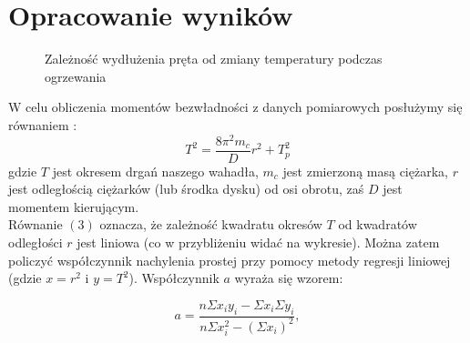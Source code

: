 \documentclass[10pt,a4paper]{article}
\newcommand{\forceindent}{\leavevmode{\parindent=3em\indent}}
\begin{document}
\section{Opracowanie wyników}

\begin{figure}[!h]
\centering
{}
\caption{Zależność wydłużenia pręta od zmiany temperatury podczas ogrzewania}
\label{fig:wyk}
\end{figure}

\forceindent W celu obliczenia momentów bezwładności z danych pomiarowych posłużymy się równaniem :
\begin{equation}
T^2 = \frac{8 \pi^2 m_c}{D}r^2 + T_p^2
\end{equation}
gdzie $T$ jest okresem drgań naszego wahadła, $m_c$ jest zmierzoną masą ciężarka, $r$ jest odległością ciężarków (lub środka dysku) od osi obrotu, zaś $D$ jest momentem kierującym.\\
\forceindent Równanie $(3)$ oznacza, że zależność kwadratu okresów $T$ od kwadratów odległości $r$ jest liniowa (co w przybliżeniu widać na wykresie). Można zatem policzyć współczynnik nachylenia prostej przy pomocy metody regresji liniowej (gdzie $x = r^2$ i $y = T^2$). Współczynnik $a$ wyraża się wzorem:

\begin{equation}
a=\frac{n\Sigma x_i y_i - \Sigma x_i \Sigma y_i}{n\Sigma x_i^2 - (\Sigma x_i)^2},
\end{equation}
\end{document}
